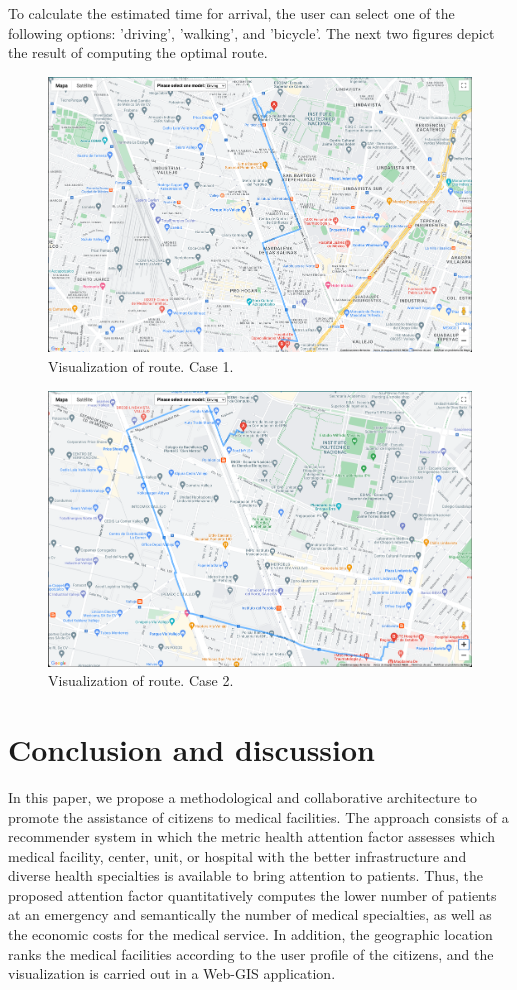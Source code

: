 \documentclass[sustainability,article,submit,pdftex,moreauthors]{Definitions/mdpi}
\begin{document}
To calculate the estimated time for arrival, the user can select one of the following options: 'driving', 'walking', and 'bicycle'. The next two figures depict the result of computing the optimal route.


\begin{figure}[H]
\includegraphics[width=10.5 cm]{ruta_uno.png}
\caption{Visualization of route. Case 1.\label{figure_ruta_uno}}
\end{figure}
\unskip

\begin{figure}[H]
\includegraphics[width=10.5 cm]{ruta_dos.png}
\caption{Visualization of route. Case 2.\label{figure_ruta_dos}}
\end{figure}
\unskip


\section{Conclusion and discussion}
In this paper, we propose a methodological and collaborative architecture to promote the assistance of citizens to medical facilities. The approach consists of a recommender system in which the metric health attention factor assesses which medical facility, center, unit, or hospital with the better infrastructure and diverse health specialties is available to bring attention to patients. Thus, the proposed attention factor quantitatively computes the lower number of patients at an emergency and semantically the number of medical specialties, as well as the economic costs for the medical service. In addition, the geographic location ranks the medical facilities according to the user profile of the citizens, and the visualization is carried out in a Web-GIS application.
\end{document}
